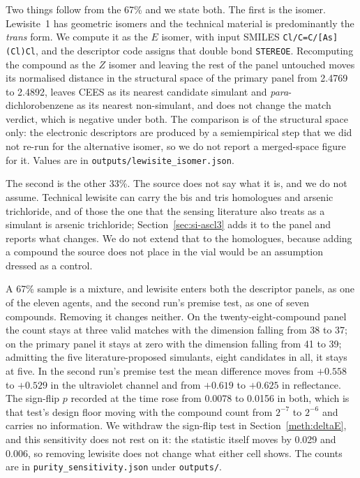 \documentclass[journal=jacsat,manuscript=suppinfo,margin=1in]{achemso}
\begin{document}
Two things follow from the 67\% and we state both. The first is the isomer.
Lewisite~1 has geometric isomers and the technical material is predominantly
the \textit{trans} form. We compute it as the $E$ isomer, with input SMILES
\texttt{Cl/C=C/[As](Cl)Cl}, and the descriptor code assigns that double bond
\texttt{STEREOE}. Recomputing the compound as the $Z$ isomer and leaving the
rest of the panel untouched moves its normalised distance in the structural
space of the primary panel from 2.4769 to 2.4892, leaves CEES as its nearest
candidate simulant and \textit{para}-dichlorobenzene as its nearest
non-simulant, and does not change the match verdict, which is negative under
both. The comparison is of the structural space only: the electronic
descriptors are produced by a semiempirical step that we did not re-run for
the alternative isomer, so we do not report a merged-space figure for it.
Values are in \texttt{outputs/lewisite\_isomer.json}.

The second is the other 33\%. The source does not say what it is, and we do
not assume. Technical lewisite can carry the bis and tris homologues and
arsenic trichloride, and of those the one that the sensing literature also
treats as a simulant is arsenic trichloride; Section~\ref{sec:si-ascl3} adds
it to the panel and reports what changes. We do not extend that to the
homologues, because adding a compound the source does not place in the vial
would be an assumption dressed as a control.

A 67\% sample is a mixture, and lewisite enters both the descriptor panels, as
one of the eleven agents, and the second run's premise test, as one of seven
compounds. Removing it changes neither. On the twenty-eight-compound panel the
count stays at three valid matches with the dimension falling from 38 to 37; on
the primary panel it stays at zero with the dimension falling from 41 to 39;
admitting the five literature-proposed simulants, eight candidates in all, it
stays at five. In the second run's
premise test the mean difference moves from $+0.558$ to $+0.529$ in the
ultraviolet channel and from $+0.619$ to $+0.625$ in reflectance. The
sign-flip $p$ recorded at the time rose from 0.0078 to 0.0156 in both, which
is that test's design floor moving with the compound count from $2^{-7}$ to
$2^{-6}$ and carries no information. We withdraw the sign-flip test in
Section~\ref{meth:deltaE}, and this sensitivity does not rest on it: the
statistic itself moves by 0.029 and 0.006, so removing lewisite does not
change what either cell shows. The counts are in \texttt{purity\_sensitivity.json} under
\texttt{outputs/}.
\end{document}
